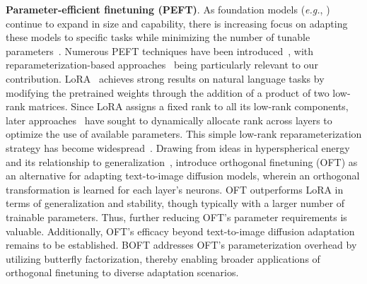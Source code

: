\textbf{Parameter-efficient finetuning (PEFT)}. As foundation models (\emph{e.g.}, \cite{brown2020language,radford2021learning,rombach2022high,kirillov2023segment}) continue to expand in size and capability, there is increasing focus on adapting these models to specific tasks while minimizing the number of tunable parameters~\cite{treviso2023efficient,ding2023parameter,lialin2023scaling}. Numerous PEFT techniques have been introduced~\cite{houlsby2019parameter,aghajanyan2020intrinsic,hulora2022,edalati2022krona,wang2022adamix,gheini2021cross,zaken2022bitfit,guo2020parameter,sung2021training,ansell2022composable,lester2021power,li2021prefix,vu2022spot,he2021towards,mao2021unipelt,karimi2021compacter,liu2022few,sung2022lst,chen2022parameter,jia2022visual,chen2022adaptformer,zhang2022neural,jie2023fact,lian2022scaling,luo2023towards}, with reparameterization-based approaches~\cite{aghajanyan2020intrinsic,hulora2022,edalati2022krona} being particularly relevant to our contribution. LoRA~\cite{hulora2022} achieves strong results on natural language tasks by modifying the pretrained weights through the addition of a product of two low-rank matrices. Since LoRA assigns a fixed rank to all its low-rank components, later approaches~\cite{zhang2022adaptive,valipour2022dylora,zhang2023increlora} have sought to dynamically allocate rank across layers to optimize the use of available parameters. This simple low-rank reparameterization strategy has become widespread~\cite{dettmers2023qlora,zi2023delta,chavan2023one}. Drawing from ideas in hyperspherical energy and its relationship to generalization~\cite{liu2018learning,liu2021orthogonal}, \cite{qiu2023controlling} introduce orthogonal finetuning (OFT) as an alternative for adapting text-to-image diffusion models, wherein an orthogonal transformation is learned for each layer's neurons. OFT outperforms LoRA in terms of generalization and stability, though typically with a larger number of trainable parameters. Thus, further reducing OFT's parameter requirements is valuable. Additionally, OFT's efficacy beyond text-to-image diffusion adaptation remains to be established. BOFT addresses OFT's parameterization overhead by utilizing butterfly factorization, thereby enabling broader applications of orthogonal finetuning to diverse adaptation scenarios.

